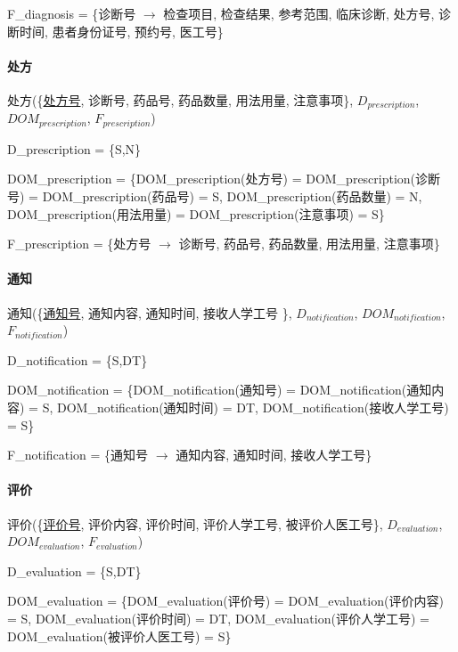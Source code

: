\documentclass{article}
\begin{document}
F\_diagnosis = \{诊断号 $\rightarrow$ 检查项目, 检查结果, 参考范围, 临床诊断, 处方号, 诊断时间, 患者身份证号, 预约号, 医工号\}

\paragraph{处方}

处方(\{\underline{处方号}, 诊断号, 药品号, 药品数量, 用法用量, 注意事项\}, $D_{prescription}$, $DOM_{prescription}$, $F_{prescription}$)

D\_prescription = \{S,N\}

DOM\_prescription = \{DOM\_prescription(处方号) = DOM\_prescription(诊断号) = \newline DOM\_prescription(药品号) = S, DOM\_prescription(药品数量) = N, \newline DOM\_prescription(用法用量) = DOM\_prescription(注意事项) = S\}

F\_prescription = \{处方号 $\rightarrow$ 诊断号, 药品号, 药品数量, 用法用量, 注意事项\}

\paragraph{通知}

通知(\{\underline{通知号}, 通知内容, 通知时间, 接收人学工号 \}, $D_{notification}$, \newline $DOM_{notification}$, $F_{notification}$)

D\_notification = \{S,DT\}

DOM\_notification = \{DOM\_notification(通知号) = DOM\_notification(通知内容) = S, \newline DOM\_notification(通知时间) = DT, DOM\_notification(接收人学工号) = S\}

F\_notification = \{通知号 $\rightarrow$ 通知内容, 通知时间, 接收人学工号\}

\paragraph{评价}

评价(\{\underline{评价号}, 评价内容, 评价时间, 评价人学工号, 被评价人医工号\}, $D_{evaluation}$, \newline $DOM_{evaluation}$, $F_{evaluation}$)

D\_evaluation = \{S,DT\}

DOM\_evaluation = \{DOM\_evaluation(评价号) = DOM\_evaluation(评价内容) = S, \newline DOM\_evaluation(评价时间) = DT, DOM\_evaluation(评价人学工号) = DOM\_evaluation(被评价人医工号) = S\}
\end{document}
